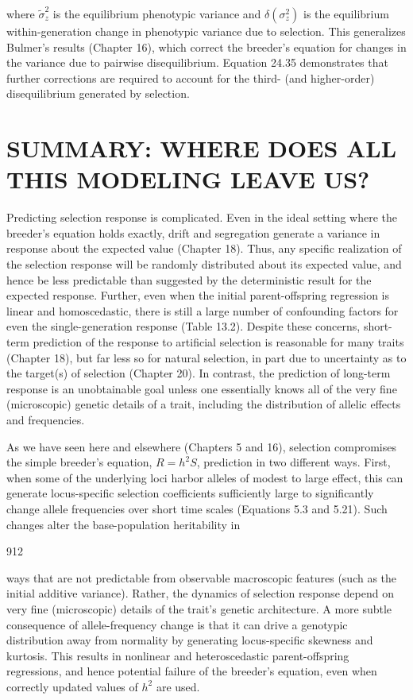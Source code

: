 \documentclass{article}
\begin{document}
where  $ \widetilde{\sigma}_{z}^{2} $ is the equilibrium phenotypic variance and  $ \delta(\sigma_{z}^{2}) $ is the equilibrium within-generation change in phenotypic variance due to selection. This generalizes Bulmer's results (Chapter 16), which correct the breeder's equation for changes in the variance due to pairwise disequilibrium. Equation 24.35 demonstrates that further corrections are required to account for the third- (and higher-order) disequilibrium generated by selection.

\section{SUMMARY: WHERE DOES ALL THIS MODELING LEAVE US?}
Predicting selection response is complicated. Even in the ideal setting where the breeder's equation holds exactly, drift and segregation generate a variance in response about the expected value (Chapter 18). Thus, any specific realization of the selection response will be randomly distributed about its expected value, and hence be less predictable than suggested by the deterministic result for the expected response. Further, even when the initial parent-offspring regression is linear and homoscedastic, there is still a large number of confounding factors for even the single-generation response (Table 13.2). Despite these concerns, short-term prediction of the response to artificial selection is reasonable for many traits (Chapter 18), but far less so for natural selection, in part due to uncertainty as to the target(s) of selection (Chapter 20). In contrast, the prediction of long-term response is an unobtainable goal unless one essentially knows all of the very fine (microscopic) genetic details of a trait, including the distribution of allelic effects and frequencies.

As we have seen here and elsewhere (Chapters 5 and 16), selection compromises the simple breeder's equation,  $ R = h^2 S $, prediction in two different ways. First, when some of the underlying loci harbor alleles of modest to large effect, this can generate locus-specific selection coefficients sufficiently large to significantly change allele frequencies over short time scales (Equations 5.3 and 5.21). Such changes alter the base-population heritability in

912

ways that are not predictable from observable macroscopic features (such as the initial additive variance). Rather, the dynamics of selection response depend on very fine (microscopic) details of the trait's genetic architecture. A more subtle consequence of allele-frequency change is that it can drive a genotypic distribution away from normality by generating locus-specific skewness and kurtosis. This results in nonlinear and heteroscedastic parent-offspring regressions, and hence potential failure of the breeder's equation, even when correctly updated values of  $ h^{2} $ are used.
\end{document}
